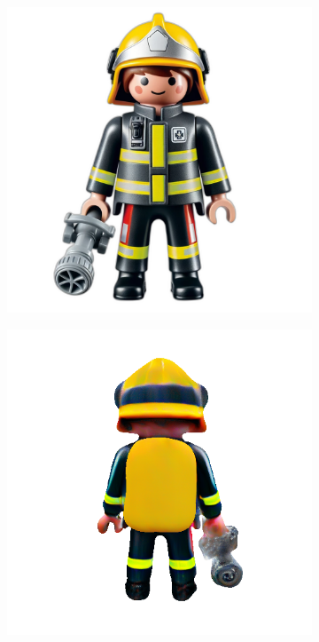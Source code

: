 \begin{figure}[ht]
    \centering
    \small
    \begin{subfigure}[b]{0.25\textwidth}
        \centering
        \includegraphics[width=\textwidth]{figures/input/playmobil.png}
        \caption{}
    \end{subfigure}
    \begin{subfigure}[b]{0.25\textwidth}
        \centering
        \includegraphics[width=\textwidth]{figures/subjective/magic123_playmobil_refine_back_10000_part1.png}

\end{subfigure}
\end{figure}
